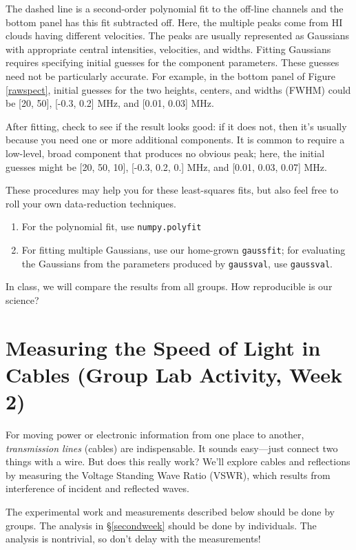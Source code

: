 \documentclass[11pt,preprint]{aastex}
\begin{document}
The dashed line is a second-order polynomial fit to the off-line
channels and the bottom panel has this fit subtracted off.  Here, the
multiple peaks come from HI clouds having different velocities. The
peaks are usually represented as Gaussians with appropriate central
intensities, velocities, and widths.  Fitting Gaussians requires
specifying initial guesses for the component parameters. These guesses
need not be particularly accurate. For example, in the bottom panel of Figure
\ref{rawspect}, initial guesses for the two heights, centers, and widths
(FWHM) could be [20, 50], [-0.3, 0.2] MHz, and [0.01, 0.03] MHz.

After
fitting, check to see if the result looks good: if it does not, then
it's usually because you need one or more additional components. It is
common to require a low-level, broad component that produces no obvious
peak; here, the initial guesses might be [20, 50, 10], [-0.3, 0.2, 0.]
MHz, and [0.01, 0.03, 0.07] MHz. 

These procedures may help you for these least-squares fits, but also
feel free to roll your own data-reduction techniques.
\begin{enumerate}
\item For the polynomial fit, use {\tt numpy.polyfit}

\item For fitting multiple Gaussians, use our home-grown {\tt gaussfit}; for
  evaluating the Gaussians from the parameters produced by {\tt gaussval}, 
  use {\tt gaussval}.
\end{enumerate}

\noindent
In class, we will compare the results from all groups. How reproducible is
our science?

\section {Measuring the Speed of Light in Cables (Group Lab Activity, Week 2)}
\label{expt}

\noindent
For moving power or electronic information from one place to
another, {\it transmission lines} (cables) are
indispensable. It sounds easy---just connect two things with a wire. But
does this really work? We'll explore cables and reflections
by measuring the Voltage Standing Wave Ratio (VSWR), which results from
interference of incident and reflected waves.

The experimental work and measurements described below should
be done by groups.  The analysis in \S \ref{secondweek} should be done
by individuals. The analysis is nontrivial, so don't delay with the
measurements!
\end{document}
